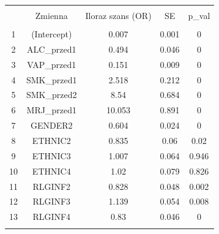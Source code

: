 
\begin{tabular}{@{\extracolsep{5pt}} ccccc} 
\\[-1.8ex]\hline 
\hline \\[-1.8ex] 
 & Zmienna & Iloraz szans (OR) & SE & p\_val \\ 
\hline \\[-1.8ex] 
1 & (Intercept) & 0.007 & 0.001 & 0 \\ 
2 & ALC\_przed1 & 0.494 & 0.046 & 0 \\ 
3 & VAP\_przed1 & 0.151 & 0.009 & 0 \\ 
4 & SMK\_przed1 & 2.518 & 0.212 & 0 \\ 
5 & SMK\_przed2 & 8.54 & 0.684 & 0 \\ 
6 & MRJ\_przed1 & 10.053 & 0.891 & 0 \\ 
7 & GENDER2 & 0.604 & 0.024 & 0 \\ 
8 & ETHNIC2 & 0.835 & 0.06 & 0.02 \\ 
9 & ETHNIC3 & 1.007 & 0.064 & 0.946 \\ 
10 & ETHNIC4 & 1.02 & 0.079 & 0.826 \\ 
11 & RLGINF2 & 0.828 & 0.048 & 0.002 \\ 
12 & RLGINF3 & 1.139 & 0.054 & 0.008 \\ 
13 & RLGINF4 & 0.83 & 0.046 & 0 \\ 
\hline \\[-1.8ex] 
\end{tabular} 
